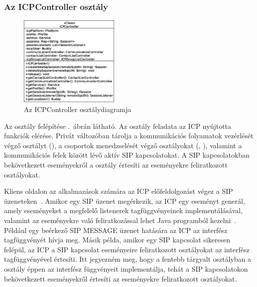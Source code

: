 \subsubsection*{Az ICPController osztály}
\label{sec:client_icpcontroller}

\begin{figure}
  \vspace{-15pt}
  \begin{center}
    \includegraphics[width=0.43\textwidth]{img/class_diagrams/client/eps/ICPController.eps}
  \end{center}
  \vspace{-15pt}
  \captionsetup{font=scriptsize}
  \caption{Az ICPController osztálydiagramja}
   \label{fig:client_icpcontroller}
  \vspace{-10pt}
\end{figure}

Az  osztály felépítése .~ábrán látható. Az osztály feladata az ICP nyújtotta funkciók elérése. Privát változóban tárolja a kommunikációs folyamatok vezérlését végző osztályt (), a csoportok menedzselését végző osztályokat (, ), valamint a kommunikációs felek között lévő aktív SIP kapcsolatokat. A SIP kapcsolatokban bekövetkezett eseményekről a  osztály értesíti az eseményekre feliratkozott osztályokat.

\begin{mycomment}
Kliens oldalon az alkalmazások számára az ICP előfeldolgozást végez a SIP üzeneteken~\cite{sds_dev_guide}. Amikor egy SIP üzenet megérkezik, az ICP egy eseményt generál, amely eseményeket a megfelelő listenerek tagfüggvényeinek implementálásával, valamint az eseményekre való feliratkozással lehet Java programból kezelni~\cite{sds_client_flow}. Például egy beérkező SIP MESSAGE üzenet hatására az ICP az  interfész  tagfüggvényét hívja meg. Másik példa, amikor egy SIP kapcsolat sikeresen felépül, az ICP a SIP kapcsolat eseményeire feliratkozott osztályokat az  interfész  tagfüggvényével értesíti. Itt jegyezném meg, hogy a fentebb tárgyalt  osztályban a  osztály éppen az  interfész függvényeit implementálja, tehát a SIP kapcsolatokon bekövetkezett eseményekről értesíti az eseményekre feliratkozott osztályokat.
\end{mycomment}

